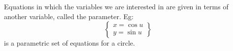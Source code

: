 Equations in which the variables we are interested in are given in terms of
another variable, called the parameter. Eg:
\[ \left \{ 
\begin{array}{c} 
    x=\cos u \\
    y=\sin u 
\end{array} \right \}  
\]
is a parametric set of equations for a circle.